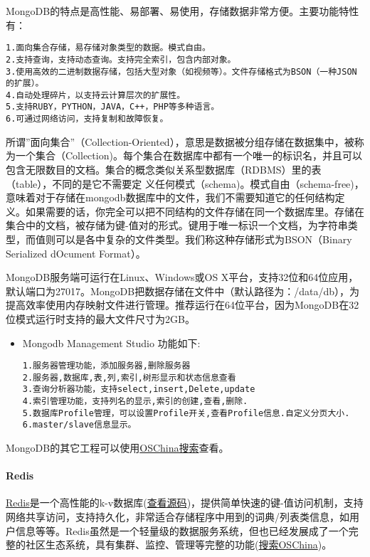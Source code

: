 \documentclass[letterpaper,10pt,english]{sphinxmanual}
\begin{document}
MongoDB的特点是高性能、易部署、易使用，存储数据非常方便。主要功能特性有：

\begin{Verbatim}[commandchars=\\\{\}]
1.面向集合存储，易存储对象类型的数据。模式自由。
2.支持查询，支持动态查询。支持完全索引，包含内部对象。
3.使用高效的二进制数据存储，包括大型对象（如视频等）。文件存储格式为BSON（一种JSON的扩展）。
4.自动处理碎片，以支持云计算层次的扩展性。
5.支持RUBY，PYTHON，JAVA，C++，PHP等多种语言。
6.可通过网络访问，支持复制和故障恢复。
\end{Verbatim}

所谓''面向集合''（Collection-Oriented），意思是数据被分组存储在数据集中，被称为一个集合（Collection)。每个集合在数据库中都有一个唯一的标识名，并且可以包含无限数目的文档。集合的概念类似关系型数据库（RDBMS）里的表（table），不同的是它不需要定
义任何模式（schema)。模式自由（schema-free)，意味着对于存储在mongodb数据库中的文件，我们不需要知道它的任何结构定义。如果需要的话，你完全可以把不同结构的文件存储在同一个数据库里。存储在集合中的文档，被存储为键-值对的形式。键用于唯一标识一个文档，为字符串类型，而值则可以是各中复杂的文件类型。我们称这种存储形式为BSON（Binary
Serialized dOcument Format）。

MongoDB服务端可运行在Linux、Windows或OS
X平台，支持32位和64位应用，默认端口为27017。MongoDB把数据存储在文件中（默认路径为：/data/db），为提高效率使用内存映射文件进行管理。推荐运行在64位平台，因为MongoDB在32位模式运行时支持的最大文件尺寸为2GB。
\begin{itemize}
\item {} 
Mongodb Management Studio 功能如下:

\begin{Verbatim}[commandchars=\\\{\}]
1.服务器管理功能，添加服务器,删除服务器
2.服务器,数据库,表,列,索引,树形显示和状态信息查看
3.查询分析器功能，支持select,insert,Delete,update
4.索引管理功能，支持列名的显示,索引的创建,查看,删除.
5.数据库Profile管理，可以设置Profile开关,查看Profile信息.自定义分页大小.
6.master/slave信息显示。
\end{Verbatim}

\end{itemize}

MongoDB的其它工程可以使用\href{http://www.oschina.net/search?scope=project\&q=mongodb}{OSChina搜索}查看。


\paragraph{Redis}
\label{gispark_cloud:Redis}
\href{http://redis.io/}{Redis}是一个高性能的k-v数据库(\href{https://github.com/antirez/redis}{查看源码})，提供简单快速的键-值访问机制，支持网络共享访问，支持持久化，非常适合存储程序中用到的词典/列表类信息，如用户信息等等。Redis虽然是一个轻量级的数据服务系统，但也已经发展成了一个完整的社区生态系统，具有集群、监控、管理等完整的功能(\href{http://www.oschina.net/search?scope=project\&q=redis}{搜索OSChina})。
\end{document}
